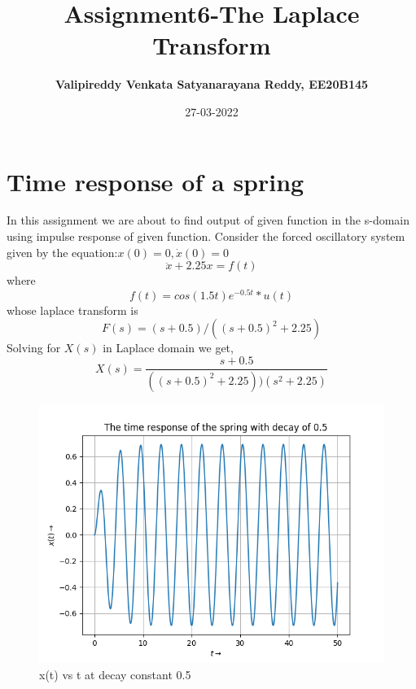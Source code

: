\documentclass[11pt, a4paper]{article}
\title{\textbf{Assignment6-The Laplace Transform}} %
\author{\textbf{Valipireddy Venkata Satyanarayana Reddy, EE20B145}} %
\date{27-03-2022} %
\begin{document}
\maketitle 

\section{Time response of a spring}
In this assignment we are about to find output of given function in the s-domain using impulse response of given function.
Consider the forced oscillatory system given by the equation:$x(0)=0,\dot x(0)=0$
\begin{equation}
    \ddot x + 2.25x = f(t)
\end{equation}
where
\begin{equation}
    f(t) = cos(1.5t)e^{-0.5t}*u(t)
\end{equation}
whose laplace transform is
\begin{equation}
    F(s) = (s+0.5)/((s+0.5)^2+2.25)
\end{equation}
Solving for $X(s)$ in Laplace domain we get,
\begin{equation}
    X(s) = \frac{s+0.5}{((s+0.5)^2+2.25))(s^2+2.25)}
\end{equation}
\begin{figure}[!tbh]
  \centering
  \includegraphics[scale=0.5]{decay_constant=0.5.png}
  \caption{x(t) vs t at decay constant 0.5} 
  \label{fig:fig1}
\end{figure} 
\end{document}
